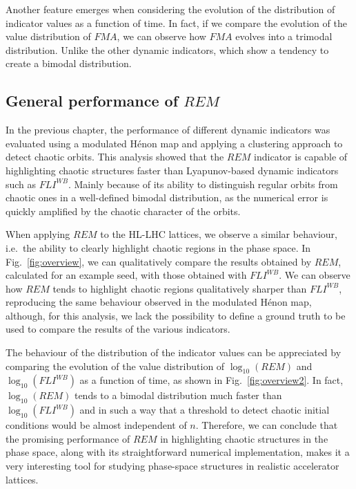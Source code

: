 Another feature emerges when considering the evolution of the distribution of indicator values as a function of time. In fact, if we compare the evolution of the value distribution of $FMA$, we can observe how $FMA$ evolves into a trimodal distribution. Unlike the other dynamic indicators, which show a tendency to create a bimodal distribution.

\subsection{General performance of $REM$}

In the previous chapter, the performance of different dynamic indicators was evaluated using a modulated Hénon map and applying a clustering approach to detect chaotic orbits. This analysis showed that the $REM$ indicator is capable of highlighting chaotic structures faster than Lyapunov-based dynamic indicators such as $FLI^{WB}$. Mainly because of its ability to distinguish regular orbits from chaotic ones in a well-defined bimodal distribution, as the numerical error is quickly amplified by the chaotic character of the orbits.

When applying $REM$ to the HL-LHC lattices, we observe a similar behaviour, i.e.\ the ability to clearly highlight chaotic regions in the phase space. In Fig.~\ref{fig:overview}, we can qualitatively compare the results obtained by $REM$, calculated for an example seed, with those obtained with $FLI^{WB}$. We can observe how $REM$ tends to highlight chaotic regions qualitatively sharper than $FLI^{WB}$, reproducing the same behaviour observed in the modulated Hénon map, although, for this analysis, we lack the possibility to define a ground truth to be used to compare the results of the various indicators.

The behaviour of the distribution of the indicator values can be appreciated by comparing the evolution of the value distribution of $\log_{10}(REM)$ and $\log_{10}(FLI^{WB})$ as a function of time, as shown in Fig.~\ref{fig:overview2}. In fact, $\log_{10}(REM)$ tends to a bimodal distribution much faster than $\log_{10}(FLI^{WB})$ and in such a way that a threshold to detect chaotic initial conditions would be almost independent of $n$. Therefore, we can conclude that the promising performance of $REM$ in highlighting chaotic structures in the phase space, along with its straightforward numerical implementation, makes it a very interesting tool for studying phase-space structures in realistic accelerator lattices.

